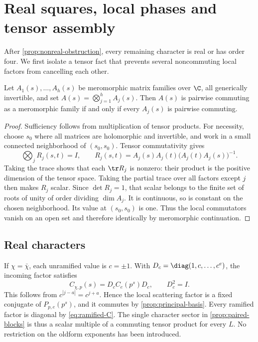 \section{Real squares, local phases and tensor assembly}\label{sec:parity}

After \cref{prop:nonreal-obstruction}, every remaining character is
real or has order four. We first isolate a tensor fact that prevents
several noncommuting local factors from cancelling each other.

\begin{lemma}\label{lem:tensor}
Let \(A_1(s),\ldots,A_h(s)\) be meromorphic matrix families over
\(\C\), all generically invertible, and set
\(A(s)=\bigotimes_{j=1}^h A_j(s)\). Then \(A(s)\) is pairwise
commuting as a meromorphic family if and only if every \(A_j(s)\)
is pairwise commuting.
\end{lemma}
\begin{proof}
Sufficiency follows from multiplication of tensor products.
For necessity, choose \(s_0\) where all matrices are holomorphic
and invertible, and work in a small connected neighborhood of
\((s_0,s_0)\). Tensor commutativity gives
\[
 \bigotimes_j R_j(s,t)=I,\qquad
 R_j(s,t)=A_j(s)A_j(t)\bigl(A_j(t)A_j(s)\bigr)^{-1}.
\]
Taking the trace shows that each \(\tr R_j\) is nonzero:
their product is the positive dimension of the tensor space.
Taking the partial trace over all factors except \(j\) then makes
\(R_j\) scalar. Since \(\det R_j=1\), that scalar belongs to the
finite set of roots of unity of order dividing \(\dim A_j\).
It is continuous, so is constant on the chosen neighborhood.
Its value at \((s_0,s_0)\) is one. Thus the local commutators vanish
on an open set and therefore identically by meromorphic
continuation.
\end{proof}

\subsection{Real characters}

If \(\chi=\bar\chi\), each unramified value is \(c=\pm1\).
With \(D_c=\diag(1,c,\ldots,c^e)\), the incoming factor satisfies
\[
 C_{\chi,p}(s)=D_c C_e(p^s)D_c,
 \qquad D_c^2=I.
\]
This follows from \(c^{|j-a|}=c^{j+a}\).
Hence the local scattering factor is a fixed conjugate of
\(P_{p,e}(p^s)\), and it commutes by \cref{prop:principal-basis}.
Every ramified factor is diagonal by \eqref{eq:ramified-C}.
The single character sector in \cref{prop:paired-blocks} is thus
a scalar multiple of a commuting tensor product for every \(L\).
No restriction on the oldform exponents has been introduced.

